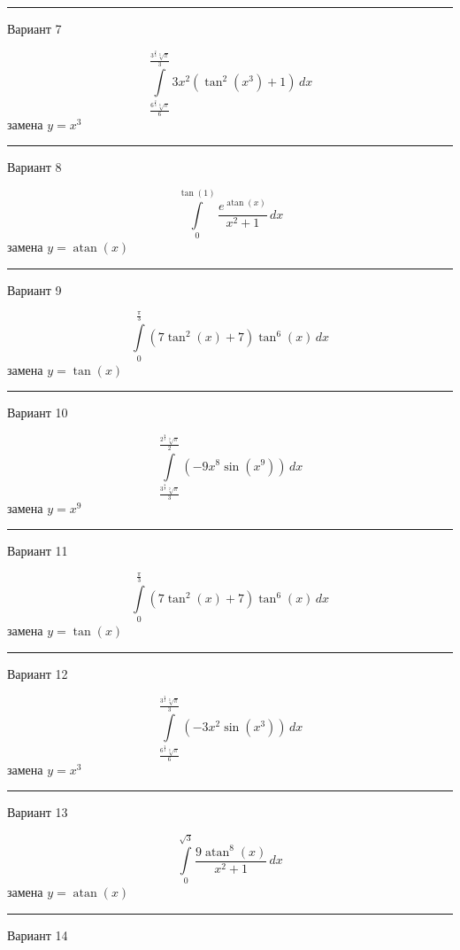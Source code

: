 \documentclass[11pt]{report}
\begin{document}
\rule{\textwidth}{.2mm}

Вариант 7

$$\int\limits_{\frac{6^{\frac{2}{3}} \sqrt[3]{\pi}}{6}}^{\frac{3^{\frac{2}{3}} \sqrt[3]{\pi}}{3}} 3 x^{2} \left(\tan^{2}{\left(x^{3} \right)} + 1\right)\, dx$$
замена $y = x^{3}$



\rule{\textwidth}{.2mm}

Вариант 8

$$\int\limits_{0}^{\tan{\left(1 \right)}} \frac{e^{\operatorname{atan}{\left(x \right)}}}{x^{2} + 1}\, dx$$
замена $y = \operatorname{atan}{\left(x \right)}$



\rule{\textwidth}{.2mm}

Вариант 9

$$\int\limits_{0}^{\frac{\pi}{3}} \left(7 \tan^{2}{\left(x \right)} + 7\right) \tan^{6}{\left(x \right)}\, dx$$
замена $y = \tan{\left(x \right)}$



\rule{\textwidth}{.2mm}

Вариант 10

$$\int\limits_{\frac{3^{\frac{8}{9}} \sqrt[9]{\pi}}{3}}^{\frac{2^{\frac{8}{9}} \sqrt[9]{\pi}}{2}} \left(- 9 x^{8} \sin{\left(x^{9} \right)}\right)\, dx$$
замена $y = x^{9}$



\rule{\textwidth}{.2mm}

Вариант 11

$$\int\limits_{0}^{\frac{\pi}{3}} \left(7 \tan^{2}{\left(x \right)} + 7\right) \tan^{6}{\left(x \right)}\, dx$$
замена $y = \tan{\left(x \right)}$



\rule{\textwidth}{.2mm}

Вариант 12

$$\int\limits_{\frac{6^{\frac{2}{3}} \sqrt[3]{\pi}}{6}}^{\frac{3^{\frac{2}{3}} \sqrt[3]{\pi}}{3}} \left(- 3 x^{2} \sin{\left(x^{3} \right)}\right)\, dx$$
замена $y = x^{3}$



\rule{\textwidth}{.2mm}

Вариант 13

$$\int\limits_{0}^{\sqrt{3}} \frac{9 \operatorname{atan}^{8}{\left(x \right)}}{x^{2} + 1}\, dx$$
замена $y = \operatorname{atan}{\left(x \right)}$



\rule{\textwidth}{.2mm}

Вариант 14
\end{document}
